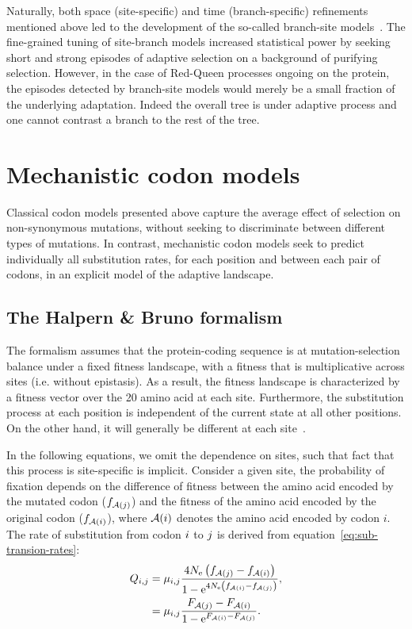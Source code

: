 Naturally, both space (site-specific) and time (branch-specific) refinements mentioned above led to the development of the so-called branch-site models~\citep{Yang2002a, Zhang2004, Pond2011, Murrell2012, Murrell2013}.
The fine-grained tuning of site-branch models increased statistical power by seeking short and strong episodes of adaptive selection on a background of purifying selection.
However, in the case of Red-Queen processes ongoing on the protein, the episodes detected by branch-site models would merely be a small fraction of the underlying adaptation.
Indeed the overall tree is under adaptive process and one cannot contrast a branch to the rest of the tree.


\section{Mechanistic {codon} models}
\label{sec:intro-mechanistic-codon-models}

Classical codon models presented above capture the average effect of selection on non-synonymous mutations, without seeking to discriminate between different types of mutations.
In contrast, mechanistic codon models seek to predict individually all substitution rates, for each position and between each pair of codons, in an explicit model of the adaptive landscape.

\subsection{The Halpern \& Bruno formalism}
\label{subsec:HB-formalism}

The \citet{Halpern1998} formalism assumes that the protein-coding sequence is at mutation-selection balance under a fixed fitness landscape, with a fitness that is multiplicative across sites (i.e. without epistasis).
As a result, the fitness landscape is characterized by a fitness vector over the 20 amino acid at each site.
Furthermore, the substitution process at each position is independent of the current state at all other positions.
On the other hand, it will generally be different at each site~\citep{Rodrigue2010, Tamuri2012}.

In the following equations, we omit the dependence on sites, such that fact that this process is site-specific is implicit.
Consider a given site, the probability of fixation depends on the difference of fitness between the amino acid encoded by the mutated codon ($f_{\mathcal{A}({j})}$) and the fitness of the amino acid encoded by the original codon ($f_{\mathcal{A}({i})}$), where $\mathcal{A}({i})$ denotes the amino acid encoded by codon $i$.
The rate of substitution from codon ${i}$ to ${j}$ is derived from equation~\ref{eq:sub-transion-rates}:
\begin{align}
    Q_{{i}, {j}} & = \mu_{{i}, {j}} \dfrac{4 N_{\textrm{e}} \left({f_{\mathcal{A}({j})} - f_{\mathcal{A}({i})}}\right)}{{1 - \mathrm{e}^{4 N_{\textrm{e}} \left({f_{\mathcal{A}({i})} - f_{\mathcal{A}({j})}}\right)} }}, \\
    & = \mu_{{i}, {j}} \dfrac{F_{\mathcal{A}({j})} - F_{\mathcal{A}({i})}}{1 - \mathrm{e}^{F_{\mathcal{A}({i})} - F_{\mathcal{A}({j})}} }.
\end{align}

